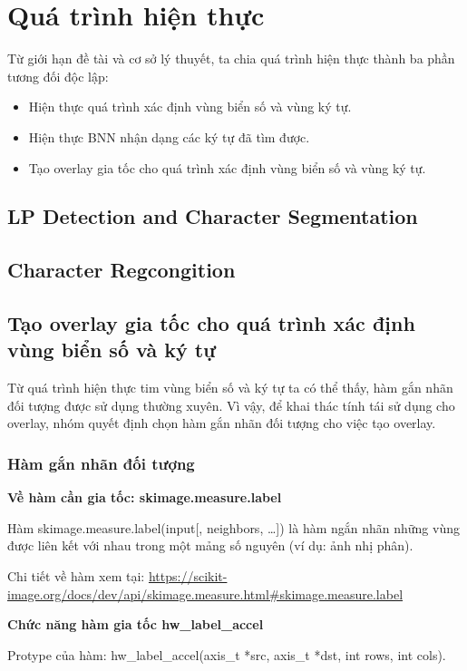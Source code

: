 \chapter{Quá trình hiện thực}
Từ giới hạn đề tài và cơ sở lý thuyết, ta chia quá trình hiện thực thành ba phần tương đối độc lập:
\begin{itemize}
    \item Hiện thực quá trình xác định vùng biển số và vùng ký tự.
    \item Hiện thực BNN nhận dạng các ký tự đã tìm được.
    \item Tạo overlay gia tốc cho quá trình xác định vùng biển số và vùng ký tự.
\end{itemize}

\section{LP Detection and Character Segmentation}
\section{Character Regcongition}
\section{Tạo overlay gia tốc cho quá trình xác định vùng biển số và ký tự}
Từ quá trình hiện thực tim vùng biển số và ký tự ta có thể thấy, hàm gắn nhãn đối tượng được sử dụng thường xuyên. Vì vậy, để khai thác tính tái sử dụng cho overlay, nhóm quyết định chọn hàm gắn nhãn đối tượng cho việc tạo overlay.

    \subsection{Hàm gắn nhãn đối tượng}
    \textbf{Về hàm cần gia tốc: skimage.measure.label}
    
    Hàm skimage.measure.label(input[, neighbors, …]) là hàm ngắn nhãn những vùng được liên kết với nhau trong một mảng số nguyên (ví dụ: ảnh nhị phân).
    
    Chi tiết về hàm xem tại: \url{https://scikit-image.org/docs/dev/api/skimage.measure.html#skimage.measure.label}
    
    \textbf{Chức năng hàm gia tốc hw\_label\_accel}
    
    Protype của hàm:
    hw\_label\_accel(axis\_t *src, axis\_t *dst, int rows, int cols).
    
